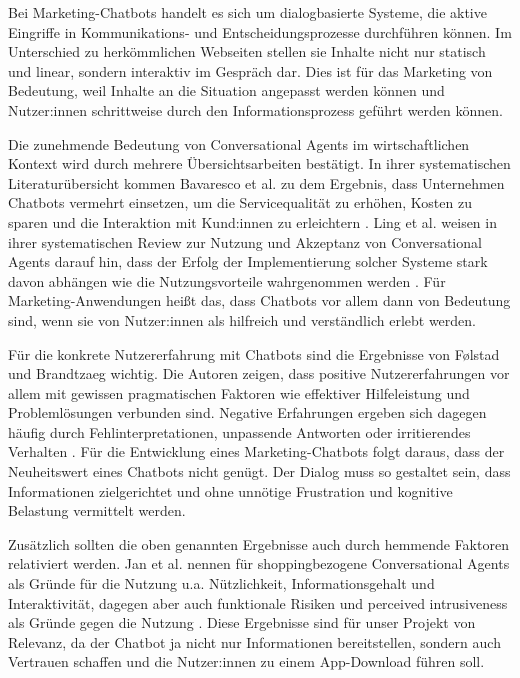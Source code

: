 Bei Marketing-Chatbots handelt es sich um dialogbasierte Systeme, die aktive 
Eingriffe in Kommunikations- und Entscheidungsprozesse durchführen können. 
Im Unterschied zu herkömmlichen Webseiten stellen sie 
Inhalte nicht nur statisch und linear, sondern interaktiv im Gespräch dar. Dies 
ist für das Marketing von Bedeutung, weil Inhalte an die Situation angepasst werden
können und Nutzer:innen schrittweise durch den Informationsprozess geführt werden
können.

Die zunehmende Bedeutung von Conversational Agents im wirtschaftlichen Kontext
wird durch mehrere Übersichtsarbeiten bestätigt. In ihrer systematischen
Literaturübersicht kommen Bavaresco et al. zu dem Ergebnis, dass Unternehmen 
Chatbots vermehrt einsetzen, um die Servicequalität zu erhöhen, Kosten zu sparen 
und die Interaktion mit Kund:innen zu erleichtern \cite{Bavaresco2020}.
Ling et al. weisen in ihrer systematischen
Review zur Nutzung und Akzeptanz von Conversational Agents darauf hin, dass
der Erfolg der Implementierung solcher Systeme stark davon abhängen wie die 
Nutzungsvorteile wahrgenommen werden \cite{Ling2021}.
Für Marketing-Anwendungen heißt das, dass Chatbots
vor allem dann von Bedeutung sind, wenn sie von Nutzer:innen als hilfreich und
verständlich erlebt werden.

Für die konkrete Nutzererfahrung mit Chatbots sind die Ergebnisse von Følstad und 
Brandtzaeg wichtig. Die Autoren zeigen, dass positive Nutzererfahrungen vor allem 
mit gewissen pragmatischen Faktoren wie effektiver Hilfeleistung und 
Problemlösungen verbunden sind. Negative Erfahrungen ergeben sich dagegen häufig 
durch Fehlinterpretationen, unpassende Antworten oder irritierendes Verhalten \cite{Folstad2020}.
Für die Entwicklung eines Marketing-Chatbots folgt daraus, dass der Neuheitswert 
eines Chatbots nicht genügt. Der Dialog muss so gestaltet sein, dass Informationen 
zielgerichtet und ohne unnötige Frustration und kognitive Belastung vermittelt 
werden.

Zusätzlich sollten die oben genannten Ergebnisse auch
durch hemmende Faktoren relativiert werden. Jan et al. nennen für
shoppingbezogene Conversational Agents als Gründe für die Nutzung u.a.
Nützlichkeit, Informationsgehalt und Interaktivität, dagegen aber auch
funktionale Risiken und perceived intrusiveness als Gründe gegen die
Nutzung \cite{Jan2023}. Diese Ergebnisse sind für unser Projekt von Relevanz, da der
Chatbot ja nicht nur Informationen bereitstellen, sondern auch Vertrauen
schaffen und die Nutzer:innen zu einem App-Download führen soll.

